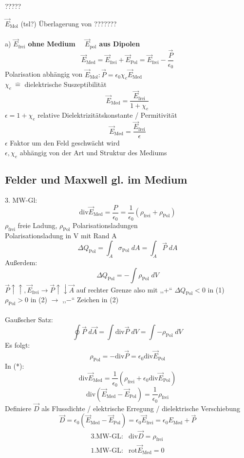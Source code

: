 \documentclass[titlepage,12pt,a4paper,ngerman]{report}
\newcommand{\tx}[1]{\textrm{#1}}
\begin{document}

?????


$\vec{E}_{\tx{Mol}}$ (tsl?) Überlagerung von ???????\\\\
a)  \textbf{$\vec{E}_{\tx{frei}}$ ohne Medium $\quad \vec{E}_{\tx{pol}}$ aus Dipolen}
$$\vec{E}_{\tx{Med}} = \vec{E}_{\tx{frei}} + \vec{E}_{\tx{Pol}} = \vec{E}_{\tx{frei}} - \frac{\vec{P}}{\epsilon_0}$$
Polarisation abhängig von $ \vec{E}_{\tx{Mol}}: \vec{P} = \epsilon_0 \chi_e \vec{E}_{\tx{Med}}$\\
$\chi_e\  \widehat{=}$ dielektrische Suszeptibilität
$$\vec{E}_{\tx{Med}} = \frac{\vec{E}_{\tx{frei}}}{1+\chi_e}$$
$\epsilon = 1+ \chi_e$  relative Dielektrizitätskonstante / Permitivität\\
$$\vec{E}_{\tx{Med}} = \frac{\vec{E}_{\tx{frei}}}{\epsilon}$$
$\epsilon$ Faktor um den Feld geschwächt wird\\
$\epsilon,\chi_e$ abhängig von der Art und Struktur des Mediums

\subsection{Felder und Maxwell gl. im Medium}
3. MW-Gl: 
\begin{equation*}
\tx{div} \vec{E}_{\tx{Med}} = \frac{P}{\epsilon_0} = \frac{1}{\epsilon_0}(\rho_{\tx{frei}} + \rho_{\tx{Pol}}) \tag{$ * $}
\end{equation*}
$\rho_{\tx{frei}}$ freie Ladung, $\rho_{\tx{Pol}}$ Polarisationsladungen\\
Polarisationsladung in V mit Rand A
\begin{equation*}
\Delta Q_{\tx{Pol}} = \int_A \sigma_{\tx{Pol}} \;dA = \int_A \vec{P} \; dA \tag{1}
\end{equation*}
Außerdem:
\begin{equation*}
\Delta Q_{\tx{Pol}} = -\int \rho_{\tx{Pol}} \; dV \tag{2}
\end{equation*}
$\vec{P}\uparrow\uparrow,\vec{E}_{\tx{frei}} \rightarrow \vec{P} \uparrow\downarrow \vec{A}$ auf rechter Grenze also mit ,,+`` $\Delta Q_{\tx{Pol}} < 0$ in (1)\\
$\rho_{\tx{Pol}} > 0$ in (2) $\rightarrow$ ,,$-$`` Zeichen in (2)\\\\
Gaußscher Satz:
$$\oint \vec{P}\; d\vec{A} = \int \tx{div} \vec{P} \; dV = \int - \rho_{\tx{Pol}} \; dV$$
Es folgt: $$\rho_{\tx{Pol}} = - \tx{div} \vec{P} = \epsilon_0 \tx{div} \vec{E}_{\tx{Pol}}$$
In (*): $$\tx{div}\vec{E}_{\tx{Med}} = \frac{1}{\epsilon_0} (\rho_{\tx{frei}} + \epsilon_0 \tx{div}\vec{E}_{\tx{Pol}})$$
$$\tx{div}(\vec{E}_{\tx{Med}} - \vec{E}_{\tx{Pol}}) = \frac{1}{\epsilon_0} \rho_{\tx{frei}}$$
Definiere  $\vec{D}$ als Flussdichte / elektrische Erregung / dielektrische Verschiebung
$$ \vec{D} = \epsilon_0(\vec{E}_{\tx{Med}} - \vec{E}_{\tx{Pol}}) = \epsilon_0 \vec{E}_{\tx{frei}} = \epsilon_0 E_{\tx{Med}} + \vec{P}$$
$$\boxed{\begin{array}{ll}
\tx{3.MW-GL}: & \tx{div}\vec{D} = \rho_\tx{frei} \\
\tx{1.MW-GL}: & \tx{rot}\vec{E}_{\tx{Med}} = 0
\end{array}
}$$
\end{document}
